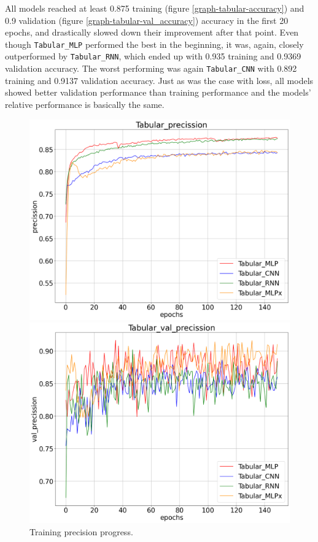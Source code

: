 All models reached at least 0.875 training (figure \ref{graph-tabular-accuracy}) and 0.9 validation (figure
\ref{graph-tabular-val_accuracy}) accuracy in the first 20 epochs, and drastically slowed down their improvement after
that point.
Even though \texttt{Tabular\_MLP} performed the best in the beginning, it was, again, closely outperformed by
\texttt{Tabular\_RNN}, which ended up with 0.935 training and 0.9369 validation accuracy.
The worst performing was again \texttt{Tabular\_CNN} with 0.892 training and 0.9137 validation accuracy.
Just as was the case with loss, all models showed better validation performance than training performance
and the models' relative performance is basically the same.


\begin{figure}[!h]
    \centering
    \begin{minipage}{0.48\textwidth}
        \centering
        \includegraphics[width=\linewidth]{obrazky-figures/Tabular_experiment/precission_2023-03-23_15:04:45.png}
        \caption{Training precision progress.}
        \label{graph-tabular-precision}
    \end{minipage}\hfill
    \begin{minipage}{0.48\textwidth}
        \centering
        \includegraphics[width=\linewidth]{obrazky-figures/Tabular_experiment/val_precission_2023-03-23_15:04:46.png}

\end{minipage}
\end{figure}
